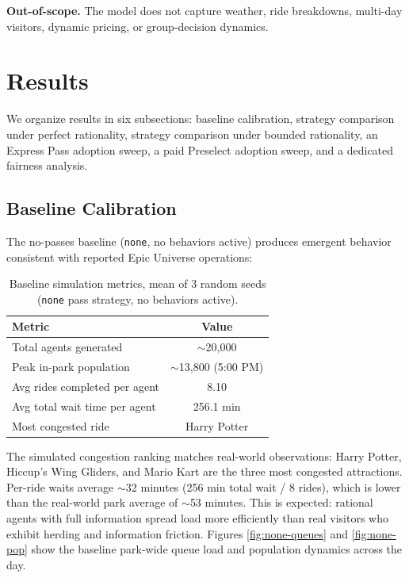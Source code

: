 \documentclass[11pt]{article}
\begin{document}
\textbf{Out-of-scope.} The model does not capture weather, ride breakdowns, multi-day visitors, dynamic pricing, or group-decision dynamics.

\section{Results}

We organize results in six subsections: baseline calibration, strategy comparison under perfect rationality, strategy comparison under bounded rationality, an Express Pass adoption sweep, a paid Preselect adoption sweep, and a dedicated fairness analysis.

\subsection{Baseline Calibration}

The no-passes baseline (\texttt{none}, no behaviors active) produces emergent behavior consistent with reported Epic Universe operations:

\begin{table}[H]
\centering
\begin{tabular}{lc}
\toprule
\textbf{Metric} & \textbf{Value} \\
\midrule
Total agents generated & $\sim$20,000 \\
Peak in-park population & $\sim$13,800 (5:00 PM) \\
Avg rides completed per agent & 8.10 \\
Avg total wait time per agent & 256.1 min \\
Most congested ride & Harry Potter \\
\bottomrule
\end{tabular}
\caption{Baseline simulation metrics, mean of 3 random seeds (\texttt{none} pass strategy, no behaviors active).}
\end{table}

The simulated congestion ranking matches real-world observations: Harry Potter, Hiccup's Wing Gliders, and Mario Kart are the three most congested attractions. Per-ride waits average $\sim$32 minutes (256 min total wait / 8 rides), which is lower than the real-world park average of $\sim$53 minutes. This is expected: rational agents with full information spread load more efficiently than real visitors who exhibit herding and information friction. Figures \ref{fig:none-queues} and \ref{fig:none-pop} show the baseline park-wide queue load and population dynamics across the day.
\end{document}
